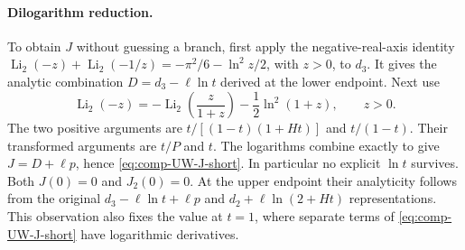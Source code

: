 \paragraph{Dilogarithm reduction.} To obtain $J$ without guessing a
branch, first apply the negative-real-axis identity
$\operatorname{Li}_2(-z)+\operatorname{Li}_2(-1/z)
=-\pi^2/6-\ln^2z/2$, with $z>0$, to $d_3$.
It gives the analytic combination $D=d_3-\ell\ln t$ derived at the lower
endpoint. Next use
\begin{equation}
 \operatorname{Li}_2(-z)
 =-\operatorname{Li}_2\!\left(\frac{z}{1+z}\right)
  -\frac12\ln^2(1+z),\qquad z>0.
\end{equation}
The two positive arguments are
$t/[(1-t)(1+Ht)]$ and $t/(1-t)$.
Their transformed arguments are $t/P$ and $t$. The logarithms combine
exactly to give $J=D+\ell p$, hence \eqref{eq:comp-UW-J-short}.
In particular no explicit $\ln t$ survives. Both $J(0)=0$ and $J_2(0)=0$.
At the upper endpoint their analyticity follows from the original
$d_3-\ell\ln t+\ell p$ and $d_2+\ell\ln(2+Ht)$ representations.
This observation also fixes the value at $t=1$, where separate terms
of \eqref{eq:comp-UW-J-short} have logarithmic derivatives.

